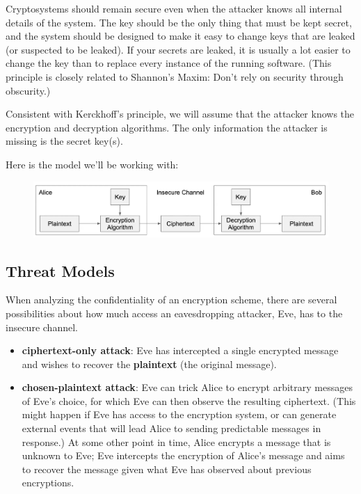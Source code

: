 \documentclass{article}
\begin{document}
\begin{definition}
    Cryptosystems should remain secure even when the attacker knows all internal details of the system. The key should be the only thing that must be kept secret, and the system should be designed to make it easy to change keys that are leaked (or suspected to be leaked). If your secrets are leaked, it is usually a lot easier to change the key than to replace every instance of the running software. (This principle is closely related to Shannon's Maxim: Don't rely on security through obscurity.)
\end{definition}
Consistent with Kerckhoff's principle, we will assume that the attacker knows the encryption and decryption algorithms. The only information the attacker is missing is the secret key(s).

Here is the model we'll be working with:
\begin{figure}[H]
    \centering
    \includegraphics[scale=0.3]{images/crypto-comm-model.png}
    \caption{}
\end{figure}
\subsection{Threat Models}
When analyzing the confidentiality of an encryption scheme, there are several possibilities about how much access an eavesdropping attacker, Eve, has to the insecure channel.

\begin{itemize}
    \item \textbf{ciphertext-only attack}: Eve has intercepted a single encrypted message and wishes to recover the \textbf{plaintext} (the original message).
    \item \textbf{chosen-plaintext attack}: Eve can trick Alice to encrypt arbitrary messages of Eve’s choice, for which Eve can then observe the resulting ciphertext. (This might happen if Eve has access to the encryption system, or can generate external events that will lead Alice to sending predictable messages in response.) At some other point in time, Alice encrypts a message that is unknown to Eve; Eve intercepts the encryption of Alice’s message and aims to recover the message given what Eve has observed about previous encryptions.
\end{itemize}
\end{document}
